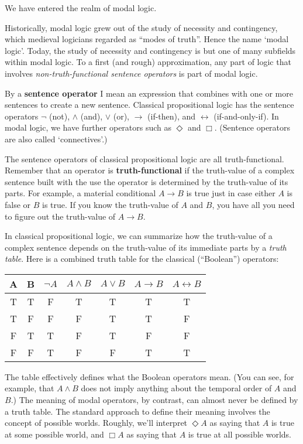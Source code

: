 We have entered the realm of modal logic.

Historically, modal logic grew out of the study of necessity and contingency,
which medieval logicians regarded as ``modes of truth''. Hence the name `modal
logic'. Today, the study of necessity and contingency is but one of many
subfields within modal logic. To a first (and rough) approximation, any part of
logic that involves \emph{non-truth-functional sentence operators} is part of
modal logic.

By a \textbf{sentence operator} I mean an expression that combines with one or
more sentences to create a new sentence. Classical propositional logic has the
sentence operators $\neg$ (not), $\land$ (and), $\lor$ (or), $\to$ (if-then),
and $\leftrightarrow$ (if-and-only-if). In modal logic, we have further
operators such as $\Diamond$ and $\Box$. (Sentence operators are also called
`connectives'.)

The sentence operators of classical propositional logic are all
truth-functional. Remember that an operator is \textbf{truth-functional} if the
truth-value of a complex sentence built with the use the operator is determined
by the truth-value of its parts. For example, a material conditional $A \to B$
is true just in case either $A$ is false or $B$ is true. If you know the
truth-value of $A$ and $B$, you have all you need to figure out the truth-value
of $A\to B$.

In classical propositional logic, we can summarize how the truth-value of a
complex sentence depends on the truth-value of its immediate parts by a
\emph{truth table}. Here is a combined truth table for the classical
(``Boolean'') operators:

\begin{center}
  \begin{tabular}{cc|ccccc}
    A & B & $\neg A$ & $A \land B$ & $A\lor B$ & $A\to B$ & $A\leftrightarrow B$\\\hline
    T & T & F & T & T & T & T\\
    T & F & F & F & T & T & F\\
    F & T & T & F & T & F & F\\
    F & F & T & F & F & T & T\\
  \end{tabular}
\end{center}
%
The table effectively defines what the Boolean operators mean. (You can see, for
example, that $A \land B$ does not imply anything about the temporal order of
$A$ and $B$.) The meaning of modal operators, by contrast, can almost never be
defined by a truth table. The standard approach to define their meaning involves
the concept of possible worlds. Roughly, we'll interpret $\Diamond A$ as saying
that $A$ is true at some possible world, and $\Box A$ as saying that $A$ is true
at all possible worlds.

